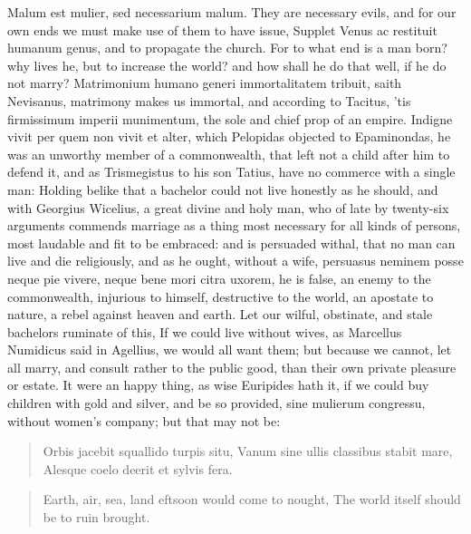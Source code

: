 Malum est mulier, sed necessarium malum. They are necessary
evils, and for our own ends we must make use of them to have issue,
 Supplet Venus ac restituit humanum genus, and to propagate the
church. For to what end is a man born? why lives he, but to increase
the world? and how shall he do that well, if he do not marry?
Matrimonium humano generi immortalitatem tribuit, saith Nevisanus,
matrimony makes us immortal, and according to Tacitus, 'tis
firmissimum imperii munimentum, the sole and chief prop of an empire.
Indigne vivit per quem non vivit et alter, which Pelopidas
objected to Epaminondas, he was an unworthy member of a commonwealth,
that left not a child after him to defend it, and as Trismegistus
to his son Tatius, have no commerce with a single man: Holding belike
that a bachelor could not live honestly as he should, and with Georgius
Wicelius, a great divine and holy man, who of late by twenty-six
arguments commends marriage as a thing most necessary for all kinds of
persons, most laudable and fit to be embraced: and is persuaded withal,
that no man can live and die religiously, and as he ought, without a
wife, persuasus neminem posse neque pie vivere, neque bene mori citra
uxorem, he is false, an enemy to the commonwealth, injurious to
himself, destructive to the world, an apostate to nature, a rebel
against heaven and earth. Let our wilful, obstinate, and stale
bachelors ruminate of this, If we could live without wives, as
Marcellus Numidicus said in  Agellius, we would all want them;
but because we cannot, let all marry, and consult rather to the public
good, than their own private pleasure or estate. It were an happy
thing, as wise Euripides hath it, if we could buy children with
gold and silver, and be so provided, sine mulierum congressu, without
women's company; but that may not be:

\begin{latin}
\begin{verse}
Orbis jacebit squallido turpis situ,
Vanum sine ullis classibus stabit mare,
Alesque coelo deerit et sylvis fera.
\end{verse}
\end{latin}
\translationrule%
\begin{verse}%
Earth, air, sea, land eftsoon would come to nought,
The world itself should be to ruin brought.
\end{verse}%

